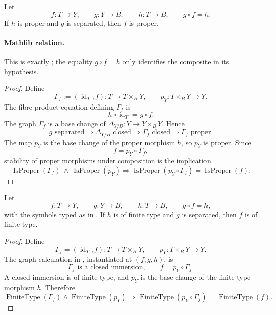\begin{lemma}
  \label{lemma:nagata-proper-to-separated-target}
  \lean{}

  Let
  \[
    f\colon T\to Y,\qquad g\colon Y\to B,\qquad h\colon T\to B,
    \qquad g\circ f=h.
  \]
  If $h$ is proper and $g$ is separated, then $f$ is proper.

  \paragraph{Mathlib relation.}
  This is exactly
  \texttt{}; the equality
  $g\circ f=h$ only identifies the composite in its hypothesis.
\end{lemma}

\begin{proof}
  Define
  \[
    \Gamma_f:=(\operatorname{id}_T,f)\colon T\to T\times_BY,
    \qquad p_Y\colon T\times_BY\to Y.
  \]
  The fibre-product equation defining $\Gamma_f$ is
  \[
    h\circ\operatorname{id}_T=g\circ f.
  \]
  The graph $\Gamma_f$ is a base change of
  $\Delta_{Y/B}\colon Y\to Y\times_BY$.  Hence
  \[
    g\text{ separated}
      \Longrightarrow\Delta_{Y/B}\text{ closed}
      \Longrightarrow\Gamma_f\text{ closed}
      \Longrightarrow\Gamma_f\text{ proper}.
  \]
  The map $p_Y$ is the base change of the proper morphism $h$, so $p_Y$ is
  proper.  Since
  \[
    f=p_Y\circ\Gamma_f,
  \]
  stability of proper morphisms under composition is the implication
  \[
    \operatorname{IsProper}(\Gamma_f)
      \ \wedge\ 
    \operatorname{IsProper}(p_Y)
      \Longrightarrow
    \operatorname{IsProper}(p_Y\circ\Gamma_f)
      =\operatorname{IsProper}(f).
  \]
\end{proof}

\begin{lemma}
  \label{lemma:nagata-finite-type-to-separated-target}
  \lean{}

  Let
  \[
    f\colon T\to Y,\qquad
    g\colon Y\to B,\qquad
    h\colon T\to B,\qquad
    g\circ f=h,                                                    \tag{FTST0}
  \]
  with the symbols typed as in
  .  If \(h\) is of finite
  type and \(g\) is separated, then \(f\) is of finite type.
\end{lemma}

\begin{proof}
  Define
  \[
    \Gamma_f=(\operatorname{id}_T,f)\colon T\to T\times_BY,
    \qquad p_Y\colon T\times_BY\to Y.
  \]
  The graph calculation in
  , instantiated at
  $(f,g,h)$, is
  \[
    \Gamma_f\text{ is a closed immersion},\qquad f=p_Y\circ\Gamma_f.
  \]
  A closed immersion is of finite type, and $p_Y$ is the base change of the
  finite-type morphism $h$.  Therefore
  \[
    \operatorname{FiniteType}(\Gamma_f)
      \wedge\operatorname{FiniteType}(p_Y)
      \Longrightarrow
    \operatorname{FiniteType}(p_Y\circ\Gamma_f)
      =\operatorname{FiniteType}(f).
  \]
\end{proof}


